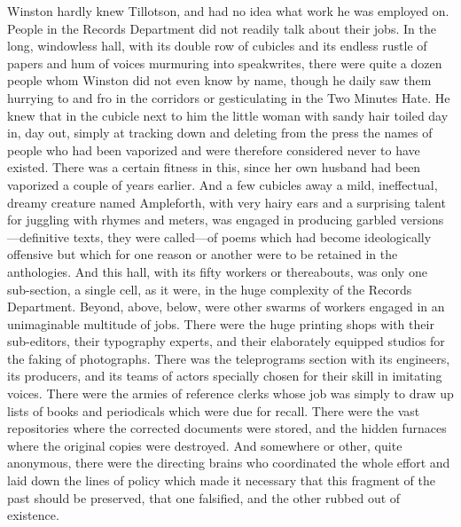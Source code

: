 Winston hardly knew Tillotson, and had no idea what work he was employed
on. People in the Records Department did not readily talk about their
jobs. In the long, windowless hall, with its double row of cubicles and
its endless rustle of papers and hum of voices murmuring into
speakwrites, there were quite a dozen people whom Winston did not even
know by name, though he daily saw them hurrying to and fro in the
corridors or gesticulating in the Two Minutes Hate. He knew that in the
cubicle next to him the little woman with sandy hair toiled day in, day
out, simply at tracking down and deleting from the press the names of
people who had been vaporized and were therefore considered never to
have existed. There was a certain fitness in this, since her own husband
had been vaporized a couple of years earlier. And a few cubicles away a
mild, ineffectual, dreamy creature named Ampleforth, with very hairy
ears and a surprising talent for juggling with rhymes and meters, was
engaged in producing garbled versions---definitive texts, they were
called---of poems which had become ideologically offensive but which for
one reason or another were to be retained in the anthologies. And this
hall, with its fifty workers or thereabouts, was only one sub-section, a
single cell, as it were, in the huge complexity of the Records
Department. Beyond, above, below, were other swarms of workers engaged
in an unimaginable multitude of jobs. There were the huge printing shops
with their sub-editors, their typography experts, and their elaborately
equipped studios for the faking of photographs. There was the
teleprograms section with its engineers, its producers, and its teams of
actors specially chosen for their skill in imitating voices. There were
the armies of reference clerks whose job was simply to draw up lists of
books and periodicals which were due for recall. There were the vast
repositories where the corrected documents were stored, and the hidden
furnaces where the original copies were destroyed. And somewhere or
other, quite anonymous, there were the directing brains who coordinated
the whole effort and laid down the lines of policy which made it
necessary that this fragment of the past should be preserved, that one
falsified, and the other rubbed out of existence.


